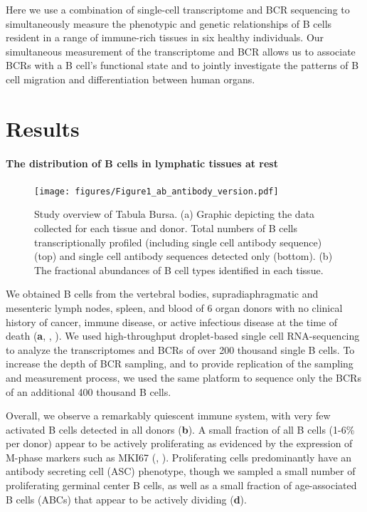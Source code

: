 Here we use a combination of single-cell transcriptome and BCR sequencing to simultaneously measure the phenotypic and genetic relationships of B cells resident in a range of immune-rich tissues in six healthy individuals. Our simultaneous measurement of the transcriptome and BCR allows us to associate BCRs with a B cell's functional state and to jointly investigate the patterns of B cell migration and differentiation between human organs.
\section{Results}

\paragraph*{The distribution of B cells in lymphatic tissues at rest}

\begin{figure}[h]
    \centering
    \texttt{[image: figures/Figure1\_ab\_antibody\_version.pdf]}

    \caption{Study overview of Tabula Bursa. (a) Graphic depicting the data collected for each tissue and donor. Total numbers of B cells transcriptionally profiled (including single cell antibody sequence) (top) and  single cell antibody sequences detected only (bottom). (b) The fractional abundances of B cell types identified in each tissue.}
    \label{fig:study-overview}
\end{figure}
\noindent We obtained B cells from the vertebral bodies, supradiaphragmatic and mesenteric lymph nodes, spleen, and blood of 6 organ donors with no clinical history of cancer, immune disease, or active infectious disease at the time of death (\textbf{a}, , \methods). We used high-throughput droplet-based single cell RNA-sequencing to analyze the transcriptomes and BCRs of over 200 thousand single B cells. To increase the depth of BCR sampling, and to provide replication of the sampling and measurement process, we used the same platform to sequence only the BCRs of an additional 400 thousand B cells. 

Overall, we observe a remarkably quiescent immune system, with very few activated B cells detected in all donors (\textbf{b}). A small fraction of all B cells (1-6\% per donor) appear to be actively proliferating as evidenced by the expression of M-phase markers such as MKI67 (\methods, ).  Proliferating cells predominantly have an antibody secreting cell (ASC) phenotype, though we sampled a small number of proliferating germinal center B cells, as well as a small fraction of age-associated B cells (ABCs) that appear to be actively dividing (\textbf{d}).

